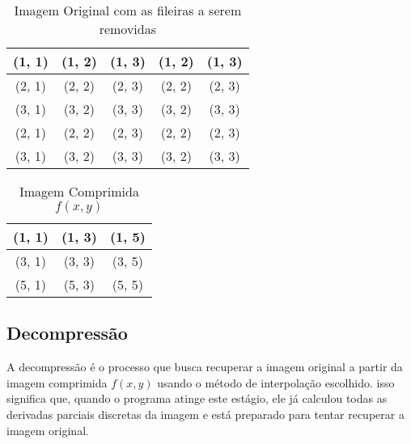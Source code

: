 \documentclass[11pt]{article}
\begin{document}
  \begin{table}[h!]
    \centering
    \begin{tabular}{| c | c | c | c | c |}
      \hline
      (1, 1) \cellcolor{gray} & (1, 2) \cellcolor{red} & (1, 3) \cellcolor{gray} & (1, 2) \cellcolor{red} & (1, 3) \cellcolor{gray} \\
      \hline
      (2, 1) \cellcolor{red} & (2, 2) \cellcolor{red} & (2, 3) \cellcolor{red}  & (2, 2) \cellcolor{red} & (2, 3) \cellcolor{red} \\
      \hline
      (3, 1) \cellcolor{gray} & (3, 2) \cellcolor{red} & (3, 3) \cellcolor{gray}  & (3, 2) \cellcolor{red} & (3, 3) \cellcolor{gray} \\
      \hline
      (2, 1) \cellcolor{red} & (2, 2) \cellcolor{red} & (2, 3) \cellcolor{red}  & (2, 2) \cellcolor{red} & (2, 3) \cellcolor{red} \\
      \hline
      (3, 1) \cellcolor{gray} & (3, 2) \cellcolor{red} & (3, 3) \cellcolor{gray}  & (3, 2) \cellcolor{red} & (3, 3) \cellcolor{gray} \\
      \hline
    \end{tabular}
    \caption*{Imagem Original com as fileiras a serem removidas}
  \end{table}

  \begin{table}[h!]
    \centering
    \begin{tabular}{| c | c | c |}
      \hline
      (1, 1) \cellcolor{gray} & (1, 3) \cellcolor{gray} & (1, 5) \cellcolor{gray} \\
      \hline
      (3, 1) \cellcolor{gray} & (3, 3) \cellcolor{gray} & (3, 5) \cellcolor{gray} \\
      \hline
      (5, 1) \cellcolor{gray} & (5, 3) \cellcolor{gray} & (5, 5) \cellcolor{gray} \\
      \hline
    \end{tabular}
    \caption*{Imagem Comprimida $f(x, y)$}
  \end{table}

  \pagebreak

  \subsection{Decompressão}

  \indent\indent A decompressão é o processo que busca recuperar a imagem original a partir da imagem comprimida $f(x, y)$ usando o método de interpolação escolhido. isso significa que,
  quando o programa atinge este estágio, ele já calculou todas as derivadas parciais discretas da imagem e está preparado para tentar recuperar a imagem original.
\end{document}

